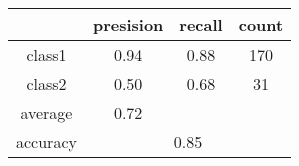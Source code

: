 
    \begin{tabular}{ | c | c | c | c | }
	\hline
	         &presision & recall & count \\ \hline
	class1   & 0.94    & 0.88  & 170 \\ \hline
	class2   & 0.50    & 0.68  & 31 \\ \hline
	average  & 0.72    &        &       \\
	\hline
	accuracy & \multicolumn{3}{c|}{0.85}\\
	\hline
    \end{tabular}